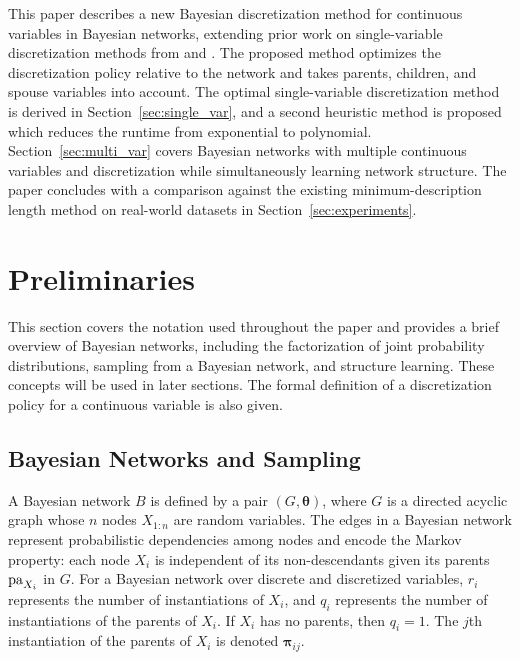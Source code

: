 This paper describes a new Bayesian discretization method for continuous variables in Bayesian networks, extending prior work on single-variable discretization methods from \citet{Boulle_2006} and \citet{Lustgarten_2011}.
The proposed method optimizes the discretization policy relative to the network and takes parents, children, and spouse variables into account.
The optimal single-variable discretization method is derived in Section~\ref{sec:single_var}, and a second heuristic method is proposed which reduces the runtime from exponential to polynomial.
Section~\ref{sec:multi_var} covers Bayesian networks with multiple continuous variables and discretization while simultaneously learning network structure.
The paper concludes with a comparison against the existing minimum-description length \citep{Friedman_1996} method on real-world datasets in Section~\ref{sec:experiments}.


\section{Preliminaries}
\label{sec:preliminaries}
This section covers the notation used throughout the paper and provides a brief overview of Bayesian networks, including the factorization of joint probability distributions, sampling from a Bayesian network, and structure learning.
These concepts will be used in later sections.
The formal definition of a discretization policy for a continuous variable is also given.

\subsection{Bayesian Networks and Sampling}

A Bayesian network $B$ is defined by a pair $(G,\bm{\theta})$, where $G$ is a directed acyclic graph whose $n$ nodes $X_{1:n}$ are random variables.
The edges in a Bayesian network represent probabilistic dependencies among nodes and encode the Markov property: each node $X_i$ is independent of its non-descendants given its parents $\operatorname{pa}_{X_i}$ in $G$.
For a Bayesian network over discrete and discretized variables, $r_i$ represents the number of instantiations of $X_i$, and $q_i$ represents the number of instantiations of the parents of $X_i$.
If $X_i$ has no parents, then $q_i = 1$.
The $j$th instantiation of the parents of $X_i$ is denoted $\bm{\pi}_{ij}$.

